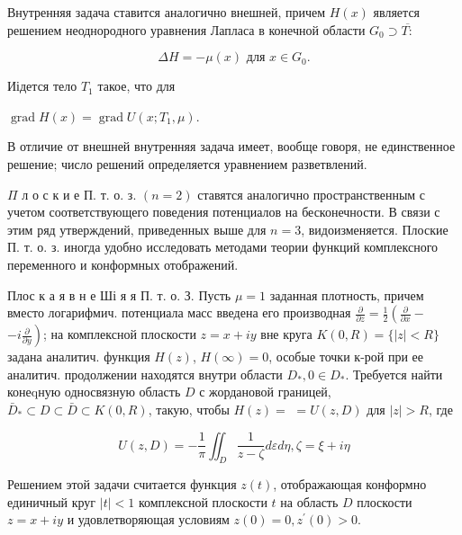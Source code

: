 \documentclass[10pt]{article}
\begin{document}
Внутренняя задача ставится аналогично внешней, причем $H(x)$ является решением неоднородного уравнения Лапласа в конечной области $G_{0} \supset \overline{T:}$



\[

\Delta H=-\mu(x) \text { для } x \in G_{0} .

\]



Иідется тело $T_{1}$ такое, что для



$\operatorname{grad} H(x)=\operatorname{grad} U\left(x ; T_{1}, \mu\right)$.



В отличие от внешней внутренняя задача имеет, вообще говоря, не единственное решение; число решений определяется уравнением разветвлений.



$\Pi$ л о с к и е П. т. о. з. $(n=2)$ ставятся аналогично пространственным с учетом соответствующего поведения потенциалов на бесконечности. В связи с этим ряд утверждений, приведенных выше для $n=3$, видоизменяется. Плоские П. т. о. з. иногда удобно исследовать методами теории функций комплексного переменного и конформных отображений.



Плос к а я в н е Ші я я П. т. о. З. Пусть $\mu=1$ заданная плотность, причем вместо логарифмич. потенциала масс введена его производная $\frac{\partial}{\partial z}=\frac{1}{2}\left(\frac{\partial}{\partial x}-\right.$ $\left.-i \frac{\partial}{\partial y}\right)$; на комплексной плоскости $z=x+i y$ вне круга $K(0, R)=\{|z|<R\}$ задана аналитич. функция $H(z)$, $H(\infty)=0$, особые точки к-рой при ее аналитич. продолжении находятся внутри области $D_{*}, 0 \in D_{*}$. Требуется найти конеqную односвязную область $D$ с жордановой границей, $\bar{D}_{*} \subset D \subset \bar{D} \subset K(0, R)$, такую, чтобы $H(z)=$ $=U(z, D)$ для $|z|>R$, где



\[

U(z, D)=-\frac{1}{\pi} \iint_{D} \frac{1}{z-\zeta} d \varepsilon d \eta, \zeta=\xi+i \eta

\]



Решением этой задачи считается функция $z(t)$, отображающая конформно единичный круг $|t|<1$ комплексной плоскости $t$ на область $D$ плоскости $z=x+i y$ и удовлетворяющая условиям $z(0)=0, z^{\prime}(0)>0$.
\end{document}
